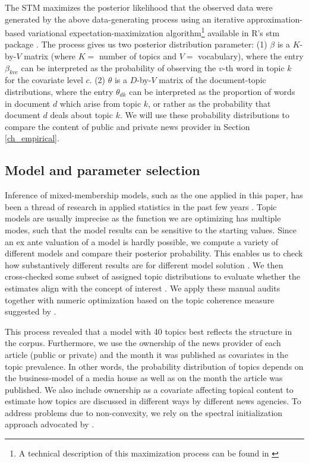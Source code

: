 \documentclass[12pt,a4paper,notitlepage]{article}
\begin{document}
The STM maximizes the posterior likelihood that the observed data were generated by the above data-generating process using an iterative approximation-based variational expectation-maximization algorithm\footnote{A technical description of this maximization process can be found in \citet{roberts_model_2016}} available in R's stm package \citep{roberts_stm:_2016}. The process gives us two posterior distribution parameter: (1) $\beta$ is a $K$-by-$V$ matrix (where $K=$ number of topics and $V=$ vocabulary), where the entry $\beta_{kvc}$ can be interpreted as the probability of observing the $v$-th word in topic $k$ for the covariate level $c$. (2) $\theta$ is a $D$-by-$V$ matrix of the document-topic distributions, where the entry $\theta_{dk}$ can be interpreted as the proportion of words in document $d$ which arise from topic $k$, or rather as the probability that document $d$ deals about topic $k$. We will use these probability distributions to compare the content of public and private news provider in Section \ref{ch_empirical}.


\subsection{Model and parameter selection}

Inference of mixed-membership models, such as the one applied in this paper, has been a thread of research in applied statistics in the past few years \citep{blei_latent_2003} \citep{erosheva_mixed-membership_2004} \citep{braun_variational_2010}. Topic models are usually imprecise as the function we are optimizing has multiple modes, such that the model results can be sensitive to the starting values. Since an ex ante valuation of a model is hardly possible, we compute a variety of different models and compare their posterior probability. This enables us to check how substantively different results are for different model solution \citep{roberts_navigating_2016}. We then cross-checked some subset of assigned topic distributions to evaluate whether the estimates align with the concept of interest \citep{gentzkow_text_2017}. We apply these manual audits together with numeric optimization based on the topic coherence measure suggested by \citet{mimno_optimizing_2011}. 

This process revealed that a model with 40 topics best reflects the structure in the corpus. Furthermore, we use the ownership of the news provider of each article (public or private) and the month it was published as covariates in the topic prevalence. In other words, the probability distribution of topics depends on the business-model of a media house as well as on the month the article was published. We also include ownership as a covariate affecting topical content to estimate how topics are discussed in different ways by different news agencies. To address problems due to non-convexity, we rely on the spectral initialization approach advocated by \citet{roberts_navigating_2016}. 
\end{document}
